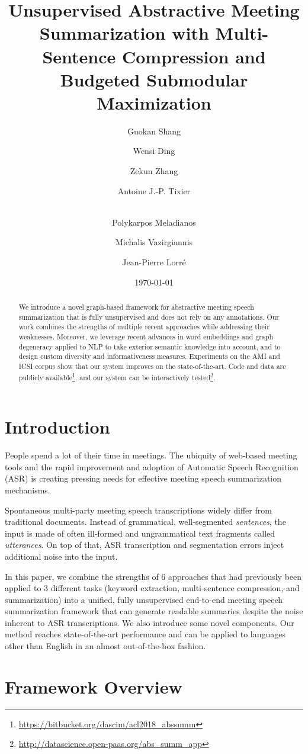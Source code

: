 \documentclass[11pt,a4paper]{article}
\title{Unsupervised Abstractive Meeting Summarization with Multi-Sentence Compression and Budgeted Submodular Maximization\Thanks{ Published as a long paper at ACL 2018. Work done as part of 3 year project, with equal contribution.}}
\author[1,2]{Guokan Shang}
\author[1]{Wensi Ding}
\author[1]{Zekun Zhang}
\author[1]{Antoine J.-P. Tixier}
\author[1,3]{\\Polykarpos Meladianos}
\author[1,3]{Michalis Vazirgiannis}
\author[2]{Jean-Pierre Lorr\'e}
\affil[1]{\'Ecole Polytechnique, Linagora, AUEB}
\date{\today}
\begin{document}
\maketitle
\begin{abstract} 
We introduce a novel graph-based framework for abstractive meeting speech summarization that is fully unsupervised and does not rely on any annotations. Our work combines the strengths of multiple recent approaches while addressing their weaknesses. 
Moreover, we leverage recent advances in word embeddings and graph degeneracy applied to NLP to take exterior semantic knowledge into account, and to design custom diversity and informativeness measures. Experiments on the AMI and ICSI  corpus show that our system improves on the state-of-the-art. Code and data are publicly available\footnote{\tiny{\url{https://bitbucket.org/dascim/acl2018_abssumm}}}, and our system can be interactively tested\footnote{\tiny{\url{http://datascience.open-paas.org/abs_summ_app}}}.
\end{abstract}

\section{Introduction}
People spend a lot of their time in meetings. The ubiquity of web-based meeting tools and the rapid improvement and adoption of Automatic Speech Recognition (ASR) is creating pressing needs for effective meeting speech summarization mechanisms.

Spontaneous multi-party meeting speech transcriptions widely differ from traditional documents. Instead of grammatical, well-segmented \textit{sentences}, the input is made of often ill-formed and ungrammatical text fragments called \textit{utterances}. On top of that, ASR transcription and segmentation errors inject additional noise into the input.

In this paper, we combine the strengths of 6 approaches that had previously been applied to 3 different tasks (keyword extraction, multi-sentence compression, and summarization) into a unified, fully unsupervised end-to-end meeting speech summarization framework that can generate readable summaries despite the noise inherent to ASR transcriptions. We also introduce some novel components. Our method reaches state-of-the-art performance and can be applied to languages other than English in an almost out-of-the-box fashion.

\section{Framework Overview}
\end{document}
